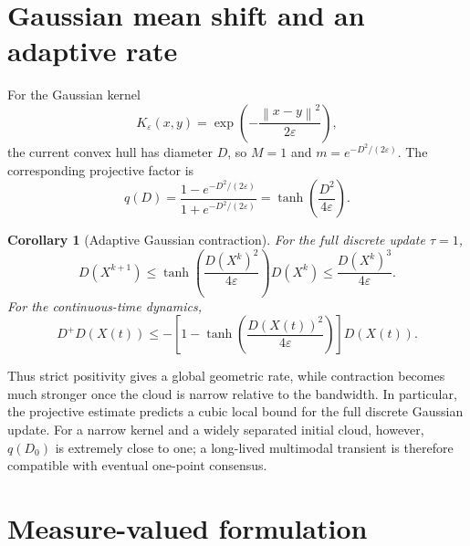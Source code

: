 \documentclass[11pt]{article}
\newtheorem{corollary}[theorem]{Corollary}
\theoremstyle{definition}
\newcommand{\eps}{\varepsilon}
\newcommand{\norm}[1]{\left\lVert #1\right\rVert}
\begin{document}
\section{Gaussian mean shift and an adaptive rate}

For the Gaussian kernel
\begin{equation}\label{eq:gaussian-kernel}
  K_\eps(x,y)=\exp\!\left(-\frac{\norm{x-y}^2}{2\eps}\right),
\end{equation}
the current convex hull has diameter $D$, so $M=1$ and
$m=e^{-D^2/(2\eps)}$.  The corresponding projective factor is
\begin{equation}\label{eq:gaussian-projective-factor}
  q(D)
  =
  \frac{1-e^{-D^2/(2\eps)}}{1+e^{-D^2/(2\eps)}}
  =
  \tanh\!\left(\frac{D^2}{4\eps}\right).
\end{equation}

\begin{corollary}[Adaptive Gaussian contraction]\label{cor:gaussian}
For the full discrete update $\tau=1$,
\begin{equation}\label{eq:gaussian-discrete-adaptive}
  D(X^{k+1})
  \leq
  \tanh\!\left(\frac{D(X^k)^2}{4\eps}\right)D(X^k)
  \leq
  \frac{D(X^k)^3}{4\eps}.
\end{equation}
For the continuous-time dynamics,
\begin{equation}\label{eq:gaussian-continuous-adaptive}
  D^+D(X(t))
  \leq
  -\left[1-\tanh\!\left(\frac{D(X(t))^2}{4\eps}\right)\right]D(X(t)).
\end{equation}
\end{corollary}

Thus strict positivity gives a global geometric rate, while contraction becomes
much stronger once the cloud is narrow relative to the bandwidth.  In
particular, the projective estimate predicts a cubic local bound for the full
discrete Gaussian update.  For a narrow kernel and a widely separated initial
cloud, however, $q(D_0)$ is extremely close to one; a long-lived multimodal
transient is therefore compatible with eventual one-point consensus.

\section{Measure-valued formulation}
\end{document}

